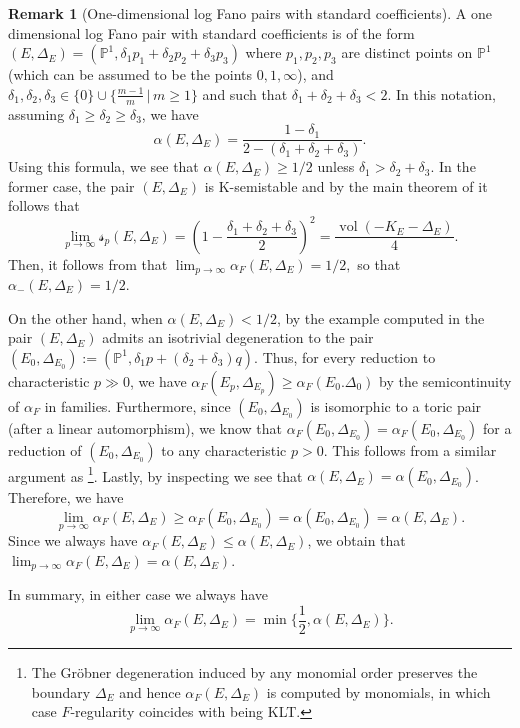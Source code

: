 \documentclass[11pt,reqno]{amsart}
\renewcommand{\P}{\mathbb{P}}
\DeclareMathOperator{\vol}{vol}
\numberwithin{equation}{section}
\theoremstyle{definition}
\newtheorem{rem}[prop] {Remark}
\newcommand{\FA}{\alpha_{F}}
\newcommand{\s}{\mathscr{s}}
\begin{document}
\begin{rem} [One-dimensional log Fano pairs with standard coefficients] 
    A one dimensional log Fano pair with standard coefficients is of the form $(E, \Delta_E) = (\P^1 , \delta_1 p_1 + \delta_2 p_2 + \delta_3 p_3)$ where $p_1,p_2,p_3$ are distinct points on $\P^1$ (which can be assumed to be the points $0, 1 , \infty$), and $\delta_1, \delta_2, \delta_3 \in \{0 \} \cup \{ \frac{m-1}{m} \, | \, m \geq 1 \}$ and such that $\delta_1 + \delta_2 + \delta_3 < 2.$ In this notation, assuming $\delta_1 \geq \delta_2 \geq \delta_3 $, we have
    \begin{equation} \label{eqn:alphaindimone} \alpha (E, \Delta_E) = \frac{1 - \delta_1}{2 - (\delta_1 + \delta_2 + \delta_3) }  .\end{equation}
    Using this formula, we see that $\alpha (E, \Delta_E) \geq 1/2$  unless $ \delta_1 > \delta_2 + \delta_3 $. In the former case, the pair $(E, \Delta_E)$ is K-semistable and by the main theorem of \cite{BCPTlimitFsigarxiv} it follows that 
    \[ \lim_{p \to \infty} \s_p (E, \Delta_E) = (1 - \frac{\delta_1 + \delta_2 + \delta_3}{2}) ^2  = \frac{\vol( -K_E - \Delta_E)}{4}.  \]
    Then, it follows from \cite[Corollary~5.8]{PandeFrobeniusAlpha} that $\lim_{p \to \infty} \FA(E, \Delta_E) = 1/2,$ so that $\alpha_{-} (E, \Delta_E) = 1/2$.

    On the other hand, when $\alpha(E, \Delta_E) < 1/2$, by the example computed in \cite[Section 4.1]{LiStabilityofSheaves}
    the pair $(E, \Delta_E)$ admits an isotrivial degeneration to the pair $(E_0, \Delta_{E_0}):= (\P^1, \delta_1 p + (\delta_2 + \delta_3) q)$.
    Thus, for every reduction to characteristic $p \gg 0$, we have $\FA(E_p, \Delta_{E_p}) \geq \FA(E_0. \Delta_0)$ by the semicontinuity of $\FA$ in families. Furthermore, since $(E_0, \Delta_{E_0})$ is isomorphic to a toric pair (after a linear automorphism), we know that $\FA(E_0, \Delta_{E_0}) = \alpha_F (E_0, \Delta_{E_0})$ for a reduction of $(E_0, \Delta_{E_0})$ to any characteristic $p>0$. This follows from a similar argument as \cite[Theorem~5.15]{PandeFrobeniusAlpha}\footnote{The Gr\"obner degeneration induced by any monomial order preserves the boundary $\Delta_E$ and hence $\FA(E, \Delta_E)$ is computed by monomials, in which case $F$-regularity coincides with being KLT.}. Lastly, by inspecting  we see that $\alpha(E, \Delta_E) = \alpha(E_0, \Delta_{E_0})$. Therefore, we have
    \[\lim_{p \to \infty} \FA(E, \Delta_E) \geq \alpha_F (E_0, \Delta_{E_0}) = \alpha(E_0,\Delta_{E_0}) = \alpha(E, \Delta_E).    \]
    Since we always have $\alpha_F (E, \Delta_E) \leq \alpha(E, \Delta_E)$, we obtain that $\lim_{p \to \infty} \FA (E, \Delta_E) = \alpha (E, \Delta_E)$.

    In summary, in either case we always have
    \begin{equation} \label{eqn:limalphaP1pairs} \lim_{p \to \infty} \FA(E, \Delta_E) =  \min \{ \frac{1}{2}, \alpha(E, \Delta_E) \} . \end{equation}
\end{rem} 
\end{document}
